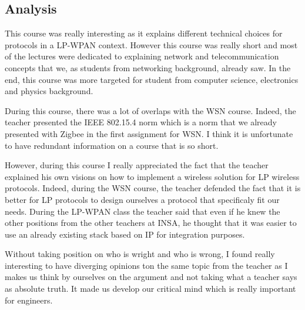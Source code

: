 \subsection{Analysis}

This course was really interesting as it explains different technical choices for protocols in a LP-WPAN context. However this course was really short and most of the lectures were dedicated to explaining network and telecommunication concepts that we, as students from networking background, already saw. In the end, this course was more targeted for student from computer science, electronics and physics background. 
\\\par

During this course, there was a lot of overlaps with the WSN course. Indeed, the teacher presented the IEEE 802.15.4 norm which is a norm that we already presented with Zigbee in the first assignment for WSN. I think it is unfortunate to have redundant information on a course that is so short.
\\\par
However, during this course I really appreciated the fact that the teacher explained his own visions on how to implement a wireless solution for LP wireless protocols. Indeed, during the WSN course, the teacher defended the fact that it is better for LP protocols to design ourselves a protocol that specificaly fit our needs. During the LP-WPAN class the teacher said that even if he knew the other positions from the other teachers at INSA, he thought that it was easier to use an already existing stack based on IP for integration purposes. 
\par
Without taking position on who is wright and who is wrong, I found really interesting to have diverging opinions ton the same topic from the teacher as I makes us think by ourselves on the argument and not taking what a teacher says as absolute truth. It made us develop our critical mind which is really important for engineers. 